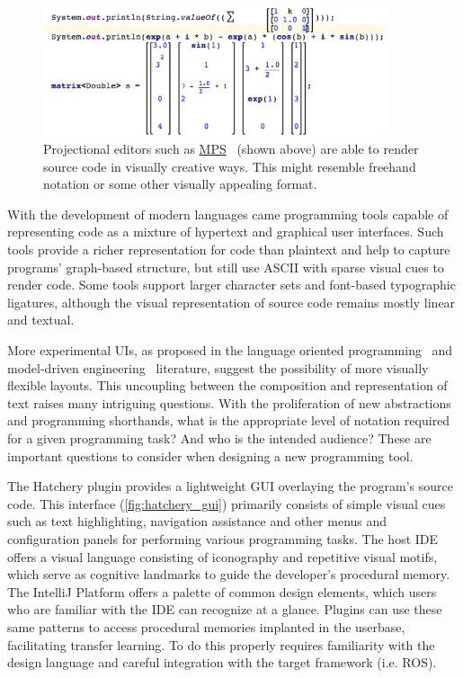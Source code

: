 \begin{figure}
\centering
\includegraphics[width=0.90\textwidth]{../figures/mps_screenshot.png}
\caption{Projectional editors such as \href{https://www.jetbrains.com/mps/}{MPS}~\citep{voelter2010language, pech2013jetbrains} (shown above) are able to render source code in visually creative ways. This might resemble freehand notation or some other visually appealing format.}
\label{fig:mps_screenshot}
\end{figure}

With the development of modern languages came programming tools capable of representing code as a mixture of hypertext and graphical user interfaces. Such tools provide a richer representation for code than plaintext and help to capture programs' graph-based structure, but still use ASCII with sparse visual cues to render code. Some tools support larger character sets and font-based typographic ligatures, although the visual representation of source code remains mostly linear and textual.

More experimental UIs, as proposed in the language oriented programming~\citep{dmitriev2004language} and model-driven engineering~\citep{famelis2015mummint} literature, suggest the possibility of more visually flexible layouts. This uncoupling between the composition and representation of text raises many intriguing questions. With the proliferation of new abstractions and programming shorthands, what is the appropriate level of notation required for a given programming task? And who is the intended audience? These are important questions to consider when designing a new programming tool.

The Hatchery plugin provides a lightweight GUI overlaying the program's source code. This interface (\autoref{fig:hatchery_gui}) primarily consists of simple visual cues such as text highlighting, navigation assistance and other menus and configuration panels for performing various programming tasks. The host IDE offers a visual language consisting of iconography and repetitive visual motifs, which serve as cognitive landmarks to guide the developer's procedural memory. The IntelliJ Platform offers a palette of common design elements, which users who are familiar with the IDE can recognize at a glance. Plugins can use these same patterns to access procedural memories implanted in the userbase, facilitating transfer learning. To do this properly requires familiarity with the design language and careful integration with the target framework (i.e. ROS).

